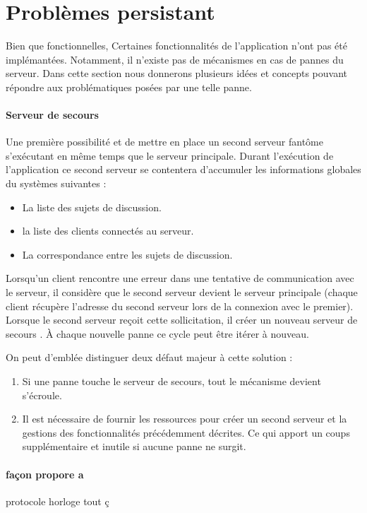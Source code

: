 \documentclass[12pt]{article}
\begin{document}
\section{Problèmes persistant}\label{sec:pblm}
Bien que fonctionnelles, Certaines fonctionnalités de l'application n'ont pas été implémantées. Notamment, il n'existe pas de mécanismes en cas de pannes du serveur. Dans cette section nous donnerons plusieurs idées et concepts pouvant répondre aux problématiques posées par une telle panne.


\paragraph{Serveur de secours}
Une première possibilité et de mettre en place un second serveur \og fantôme \fg{} s'exécutant en même temps que le serveur principale. Durant l'exécution de l'application ce second serveur se contentera d'accumuler les informations globales du systèmes suivantes : 
\begin{itemize}
\item
  La liste des sujets de discussion.
\item
  la liste des clients connectés au serveur.
\item
  La correspondance entre les sujets de discussion.
\end{itemize}
Lorsqu'un client rencontre une erreur dans une tentative de communication avec le serveur, il considère que le second serveur devient le serveur principale (chaque client récupère l'adresse du second serveur lors de la connexion avec le premier). Lorsque le second serveur reçoit cette sollicitation, il créer un nouveau  \og serveur de secours \fg{}. À chaque nouvelle panne ce cycle peut être itérer à nouveau.

On peut d'emblée distinguer deux défaut majeur à cette solution : 

\begin{enumerate}
\item
  Si une panne touche le serveur de secours, tout le mécanisme devient s'écroule.
\item
  Il est nécessaire de fournir les ressources pour créer un second serveur et la gestions des fonctionnalités précédemment décrites. Ce qui apport un coups supplémentaire et inutile si aucune panne ne surgit.
\end{enumerate}


\paragraph{façon propore a}

protocole horloge tout ç  
\end{document}
